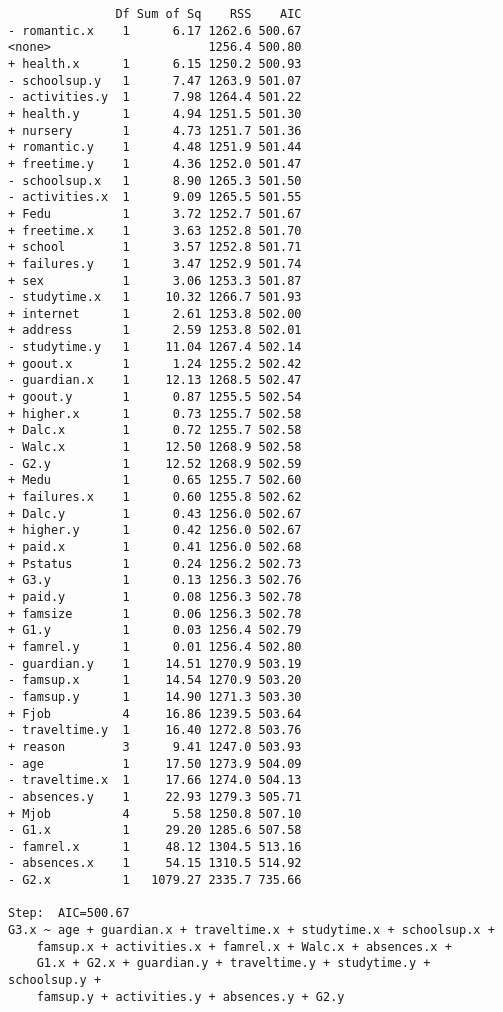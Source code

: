 \documentclass[11pt]{article}
\begin{document}
\begin{enumerate}
\begin{verbatim}
               Df Sum of Sq    RSS    AIC
- romantic.x    1      6.17 1262.6 500.67
<none>                      1256.4 500.80
+ health.x      1      6.15 1250.2 500.93
- schoolsup.y   1      7.47 1263.9 501.07
- activities.y  1      7.98 1264.4 501.22
+ health.y      1      4.94 1251.5 501.30
+ nursery       1      4.73 1251.7 501.36
+ romantic.y    1      4.48 1251.9 501.44
+ freetime.y    1      4.36 1252.0 501.47
- schoolsup.x   1      8.90 1265.3 501.50
- activities.x  1      9.09 1265.5 501.55
+ Fedu          1      3.72 1252.7 501.67
+ freetime.x    1      3.63 1252.8 501.70
+ school        1      3.57 1252.8 501.71
+ failures.y    1      3.47 1252.9 501.74
+ sex           1      3.06 1253.3 501.87
- studytime.x   1     10.32 1266.7 501.93
+ internet      1      2.61 1253.8 502.00
+ address       1      2.59 1253.8 502.01
- studytime.y   1     11.04 1267.4 502.14
+ goout.x       1      1.24 1255.2 502.42
- guardian.x    1     12.13 1268.5 502.47
+ goout.y       1      0.87 1255.5 502.54
+ higher.x      1      0.73 1255.7 502.58
+ Dalc.x        1      0.72 1255.7 502.58
- Walc.x        1     12.50 1268.9 502.58
- G2.y          1     12.52 1268.9 502.59
+ Medu          1      0.65 1255.7 502.60
+ failures.x    1      0.60 1255.8 502.62
+ Dalc.y        1      0.43 1256.0 502.67
+ higher.y      1      0.42 1256.0 502.67
+ paid.x        1      0.41 1256.0 502.68
+ Pstatus       1      0.24 1256.2 502.73
+ G3.y          1      0.13 1256.3 502.76
+ paid.y        1      0.08 1256.3 502.78
+ famsize       1      0.06 1256.3 502.78
+ G1.y          1      0.03 1256.4 502.79
+ famrel.y      1      0.01 1256.4 502.80
- guardian.y    1     14.51 1270.9 503.19
- famsup.x      1     14.54 1270.9 503.20
- famsup.y      1     14.90 1271.3 503.30
+ Fjob          4     16.86 1239.5 503.64
- traveltime.y  1     16.40 1272.8 503.76
+ reason        3      9.41 1247.0 503.93
- age           1     17.50 1273.9 504.09
- traveltime.x  1     17.66 1274.0 504.13
- absences.y    1     22.93 1279.3 505.71
+ Mjob          4      5.58 1250.8 507.10
- G1.x          1     29.20 1285.6 507.58
- famrel.x      1     48.12 1304.5 513.16
- absences.x    1     54.15 1310.5 514.92
- G2.x          1   1079.27 2335.7 735.66

Step:  AIC=500.67
G3.x ~ age + guardian.x + traveltime.x + studytime.x + schoolsup.x + 
    famsup.x + activities.x + famrel.x + Walc.x + absences.x + 
    G1.x + G2.x + guardian.y + traveltime.y + studytime.y + schoolsup.y + 
    famsup.y + activities.y + absences.y + G2.y


\end{verbatim}
\end{enumerate}
\end{document}
